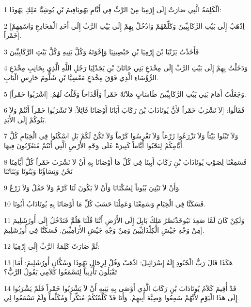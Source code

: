 \par 1 اَلْكَلِمَةُ الَّتِي صَارَتْ إِلَى إِرْمِيَا مِنْ الرَّبِّ فِي أَيَّامِ يَهُويَاقِيمَ بْنِ يُوشِيَّا مَلِكِ يَهُوذَا:
\par 2 [اِذْهَبْ إِلَى بَيْتِ الرَّكَابِيِّينَ وَكَلِّمْهُمْ وَادْخُلْ بِهِمْ إِلَى بَيْتِ الرَّبِّ إِلَى أَحَدِ الْمَخَادِعِ وَاسْقِهِمْ خَمْراً].
\par 3 فَأَخَذْتُ يَزَنْيَا بْنَ إِرْمِيَا بْنِ حَبْصِينِيَا وَإِخْوَتَهُ وَكُلَّ بَنِيهِ وَكُلَّ بَيْتِ الرَّكَابِيِّينَ
\par 4 وَدَخَلْتُ بِهِمْ إِلَى بَيْتِ الرَّبِّ إِلَى مِخْدَعِ بَنِي حَانَانَ بْنِ يَجَدْلِيَا رَجُلِ اللَّهِ الَّذِي بِجَانِبِ مِخْدَعِ الرُّؤَسَاءِ الَّذِي فَوْقَ مِخْدَعِ مَعْسِيَّا بْنِ شَلُّومَ حَارِسِ الْبَابِ.
\par 5 وَجَعَلْتُ أَمَامَ بَنِي بَيْتِ الرَّكَابِيِّينَ طَاسَاتٍ مَلآنَةً خَمْراً وَأَقْدَاحاً وَقُلْتُ لَهُمُ: [اشْرَبُوا خَمْراً].
\par 6 فَقَالُوا: [لاَ نَشْرَبُ خَمْراً لأَنَّ يُونَادَابَ بْنَ رَكَابَ أَبَانَا أَوْصَانَا قَائِلاً: لاَ تَشْرَبُوا خَمْراً أَنْتُمْ وَلاَ بَنُوكُمْ إِلَى الأَبَدِ.
\par 7 وَلاَ تَبْنُوا بَيْتاً وَلاَ تَزْرَعُوا زَرْعاً وَلاَ تَغْرِسُوا كَرْماً وَلاَ تَكُنْ لَكُمْ بَلِ اسْكُنُوا فِي الْخِيَامِ كُلَّ أَيَّامِكُمْ لِتَحْيُوا أَيَّاماً كَثِيرَةً عَلَى وَجْهِ الأَرْضِ الَّتِي أَنْتُمْ مُتَغَرِّبُونَ فِيهَا.
\par 8 فَسَمِعْنَا لِصَوْتِ يُونَادَابَ بْنِ رَكَابَ أَبِينَا فِي كُلِّ مَا أَوْصَانَا بِهِ أَنْ لاَ نَشْرَبَ خَمْراً كُلَّ أَيَّامِنَا نَحْنُ وَنِسَاؤُنَا وَبَنُونَا وَبَنَاتُنَا
\par 9 وَأَنْ لاَ نَبْنِيَ بُيُوتاً لِسُكْنَانَا وَأَنْ لاَ يَكُونَ لَنَا كَرْمٌ وَلاَ حَقْلٌ وَلاَ زَرْعٌ.
\par 10 فَسَكَنَّا فِي الْخِيَامِ وَسَمِعْنَا وَعَمِلْنَا حَسَبَ كُلِّ مَا أَوْصَانَا بِهِ يُونَادَابُ أَبُونَا.
\par 11 وَلَكِنْ كَانَ لَمَّا صَعِدَ نَبُوخَذْنَصَّرُ مَلِكُ بَابِلَ إِلَى الأَرْضِ أَنَّنَا قُلْنَا هَلُمَّ فَنَدْخُلُ إِلَى أُورُشَلِيمَ مِنْ وَجْهِ جَيْشِ الْكِلْدَانِيِّينَ وَمِنْ وَجْهِ جَيْشِ الأَرَامِيِّينَ. فَسَكَنَّا فِي أُورُشَلِيمَ].
\par 12 ثُمَّ صَارَتْ كَلِمَةُ الرَّبِّ إِلَى إِرْمِيَا:
\par 13 [هَكَذَا قَالَ رَبُّ الْجُنُودِ إِلَهُ إِسْرَائِيلَ: اذْهَبْ وَقُلْ لِرِجَالِ يَهُوذَا وَسُكَّانِ أُورُشَلِيمَ: أَمَا تَقْبَلُونَ تَأْدِيباً لِتَسْمَعُوا كَلاَمِي يَقُولُ الرَّبُّ؟
\par 14 قَدْ أُقِيمَ كَلاَمُ يُونَادَابَ بْنِ رَكَابَ الَّذِي أَوْصَى بِهِ بَنِيهِ أَنْ لاَ يَشْرَبُوا خَمْراً فَلَمْ يَشْرَبُوا إِلَى هَذَا الْيَوْمِ لأَنَّهُمْ سَمِعُوا وَصِيَّةَ أَبِيهِمْ. وَأَنَا قَدْ كَلَّمْتُكُمْ مُبَكِّراً وَمُكَلِّماً وَلَمْ تَسْمَعُوا لِي.
